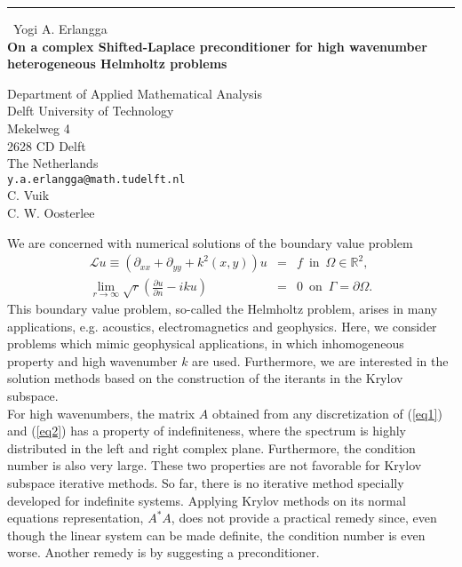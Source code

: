 \documentclass{report}
\begin{document}
\begin{center}
\rule{6in}{1pt} \
{\large Yogi A. Erlangga \\
{\bf On a complex Shifted-Laplace preconditioner for high wavenumber heterogeneous Helmholtz problems}}

Department of Applied Mathematical Analysis \\ Delft University of Technology \\ Mekelweg 4 \\ 2628 CD Delft \\ The Netherlands
\\
{\tt y.a.erlangga@math.tudelft.nl}\\
C. Vuik\\
C. W. Oosterlee\end{center}

We are concerned with numerical solutions of the boundary value problem
\begin{eqnarray}
\mathcal{L} u \equiv \left( \partial_{xx} + \partial_{yy} + k^2(x,y) \right) u
&=& f \, \, \, \text{in} \, \, \, \Omega \in \mathbb{R}^2, \label{eq1}\\
\lim_{r \rightarrow \infty} \sqrt{r} \left(\frac{\partial u}{\partial n}
- i k u \right) &=& 0 \, \, \, \text{on} \, \, \, \Gamma = \partial \Omega. \label{eq2}
\end{eqnarray}
This boundary value problem, so-called the Helmholtz problem, arises in
many applications, e.g. acoustics, electromagnetics and geophysics. Here,
we consider problems which mimic geophysical applications, in which
inhomogeneous property and high wavenumber $k$ are used. Furthermore, we
are interested in the solution methods based on the construction of the
iterants in the Krylov subspace. \\

For high wavenumbers, the matrix $A$ obtained from any discretization of
(\ref{eq1}) and (\ref{eq2}) has a property of indefiniteness, where the
spectrum is highly distributed in the left and right complex plane.
Furthermore, the condition number is also very large. These two
properties are not favorable for Krylov subspace iterative methods. So
far, there is no iterative method specially developed for indefinite
systems. Applying Krylov methods on its normal equations representation,
$A^*A$, does not provide a practical remedy since, even though the linear
system can be made definite, the condition number is even worse. Another
remedy is by suggesting a preconditioner. \\
\end{document}
